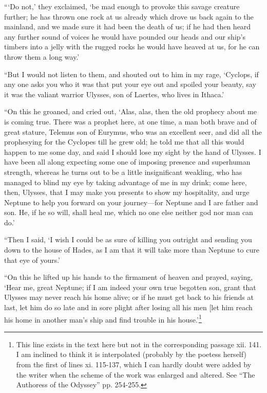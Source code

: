 “‘Do not,’ they exclaimed, ‘be mad enough to provoke this savage creature
further; he has thrown one rock at us already which drove us back again to the
mainland, and we made sure it had been the death of us; if he had then heard
any further sound of voices he would have pounded our heads and our ship’s
timbers into a jelly with the rugged rocks he would have heaved at us, for he
can throw them a long way.’

“But I would not listen to them, and shouted out to him in my rage, ‘Cyclops,
if any one asks you who it was that put your eye out and spoiled your beauty,
say it was the valiant warrior Ulysses, son of Laertes, who lives in Ithaca.’

“On this he groaned, and cried out, ‘Alas, alas, then the old prophecy about me
is coming true. There was a prophet here, at one time, a man both brave and of
great stature, Telemus son of Eurymus, who was an excellent seer, and did all
the prophesying for the Cyclopes till he grew old; he told me that all this
would happen to me some day, and said I should lose my sight by the hand of
Ulysses. I have been all along expecting some one of imposing presence and
superhuman strength, whereas he turns out to be a little insignificant
weakling, who has managed to blind my eye by taking advantage of me in my
drink; come here, then, Ulysses, that I may make you presents to show my
hospitality, and urge Neptune to help you forward on your journey—for Neptune
and I are father and son. He, if he so will, shall heal me, which no one else
neither god nor man can do.’

“Then I said, ‘I wish I could be as sure of killing you outright and sending
you down to the house of Hades, as I am that it will take more than Neptune to
cure that eye of yours.’

“On this he lifted up his hands to the firmament of heaven and prayed, saying,
‘Hear me, great Neptune; if I am indeed your own true begotten son, grant that
Ulysses may never reach his home alive; or if he must get back to his friends
at last, let him do so late and in sore plight after losing all his men [let
him reach his home in another man’s ship and find trouble in his house.’\footnote{This line exists in the text here but not in the corresponding passage xii.
141. I am inclined to think it is interpolated (probably by the poetess
herself) from the first of lines xi. 115-137, which I can hardly doubt were
added by the writer when the scheme of the work was enlarged and altered. See
“The Authoress of the Odyssey” pp. 254-255.}

